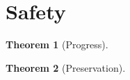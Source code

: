 \documentclass[10pt]{scrartcl}
\newtheorem{theorem}{Theorem}
\begin{document}
\section{Safety}
\label{sec:safety}

\begin{theorem}[Progress]
  
\end{theorem}

\begin{theorem}[Preservation]
  
\end{theorem}
\end{document}
